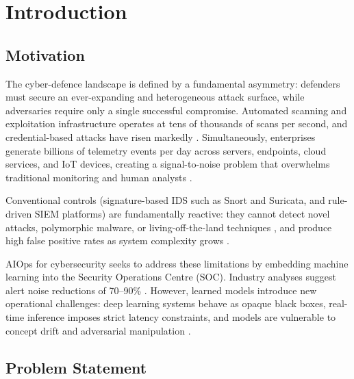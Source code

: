 \documentclass[12pt,a4paper]{report}
\begin{document}
\tableofcontents

\pagestyle{fancy}
\chapter{Introduction}
\label{ch:introduction}

\section{Motivation}
\label{sec:motivation}

The cyber-defence landscape is defined by a fundamental asymmetry: defenders must secure an ever-expanding and heterogeneous attack surface, while adversaries require only a single successful compromise. Automated scanning and exploitation infrastructure operates at tens of thousands of scans per second, and credential-based attacks have risen markedly \cite{fortinet2025}. Simultaneously, enterprises generate billions of telemetry events per day across servers, endpoints, cloud services, and IoT devices, creating a signal-to-noise problem that overwhelms traditional monitoring and human analysts \cite{dang2019}.

Conventional controls (signature-based IDS such as Snort and Suricata, and rule-driven SIEM platforms) are fundamentally reactive: they cannot detect novel attacks, polymorphic malware, or living-off-the-land techniques \cite{ahmad2021}, and produce high false positive rates as system complexity grows \cite{zhu2023}.

AIOps for cybersecurity seeks to address these limitations by embedding machine learning into the Security Operations Centre (SOC). Industry analyses suggest alert noise reductions of 70--90\% \cite{nguyen2024}. However, learned models introduce new operational challenges: deep learning systems behave as opaque black boxes, real-time inference imposes strict latency constraints, and models are vulnerable to concept drift and adversarial manipulation \cite{schwarzschild2021,goldblum2023}.

\section{Problem Statement}
\label{sec:problem}
\end{document}
